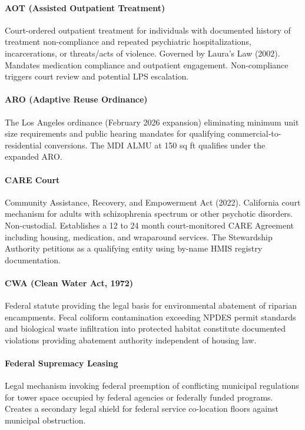 {\paragraph{AOT (Assisted Outpatient Treatment)} Court-ordered outpatient treatment for individuals with documented history of treatment non-compliance and repeated psychiatric hospitalizations, incarcerations, or threats/acts of violence. Governed by Laura's Law (2002). Mandates medication compliance and outpatient engagement. Non-compliance triggers court review and potential LPS escalation.

\paragraph{ARO (Adaptive Reuse Ordinance)} The Los Angeles ordinance (February 2026 expansion) eliminating minimum unit size requirements and public hearing mandates for qualifying commercial-to-residential conversions. The MDI ALMU at 150 sq ft qualifies under the expanded ARO.

\paragraph{CARE Court} Community Assistance, Recovery, and Empowerment Act (2022). California court mechanism for adults with schizophrenia spectrum or other psychotic disorders. Non-custodial. Establishes a 12 to 24 month court-monitored CARE Agreement including housing, medication, and wraparound services. The Stewardship Authority petitions as a qualifying entity using by-name HMIS registry documentation.

\paragraph{CWA (Clean Water Act, 1972)} Federal statute providing the legal basis for environmental abatement of riparian encampments. Fecal coliform contamination exceeding NPDES permit standards and biological waste infiltration into protected habitat constitute documented violations providing abatement authority independent of housing law.

\paragraph{Federal Supremacy Leasing} Legal mechanism invoking federal preemption of conflicting municipal regulations for tower space occupied by federal agencies or federally funded programs. Creates a secondary legal shield for federal service co-location floors against municipal obstruction.

}
